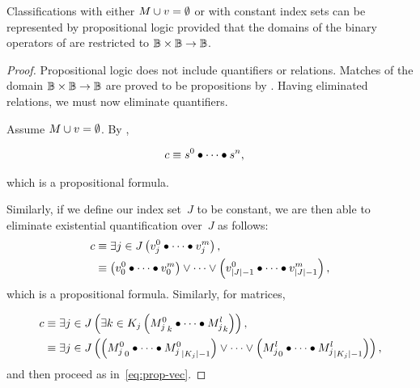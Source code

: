 \begin{theorem}
  Classifications with either $M\cup v=\emptyset$ or with constant index
    sets can be represented by propositional logic provided that the domains
    of the binary operators of  are restricted to
    $\mathbb{B}\times\mathbb{B}\rightarrow\mathbb{B}$.
\end{theorem}
\begin{proof}
  Propositional logic does not include quantifiers or relations.
  Matches of the domain $\mathbb{B}\times\mathbb{B}\rightarrow\mathbb{B}$ are proved to be propositions by
    .
  Having eliminated relations,
    we must now eliminate quantifiers.

  Assume $M\cup v=\emptyset$.
  By ,

  \begin{align*}
    c &\equiv s^0\bullet\cdots\bullet s^n,
  \end{align*}

  \noindent
  which is a propositional formula.

  Similarly,
    if we define our index set~$J$ to be constant,
      we are then able to eliminate existential quantification over~$J$
      as follows:
  \begin{equation}\label{eq:prop-vec}
  \begin{aligned}
    c &\equiv \Exists{j\in J}{\cpredvecseq}, \\
      &\equiv \left(v^0_0\monoidops v^m_0\right)
              \lor\cdots\lor
              \left(v^0_{|J|-1}\monoidops v^m_{|J|-1}\right),
  \end{aligned}
  \end{equation}
  which is a propositional formula.
  Similarly,
    for matrices,

  \begin{align*}
    c &\equiv \Exists{j\in J}{\Exists{k\in K_j}{\cpredmatseq}}, \nonumber\\
      &\equiv \Exists{j\in J}{
                \left({M^0_j}_0\monoidops{M^0_j}_{|K_j|-1}\right)
                \lor\cdots\lor
                \left({M^l_j}_0\monoidops{M^l_j}_{|K_j|-1}\right)
              },
  \end{align*}
  and then proceed as in~\ref{eq:prop-vec}.
\end{proof}
